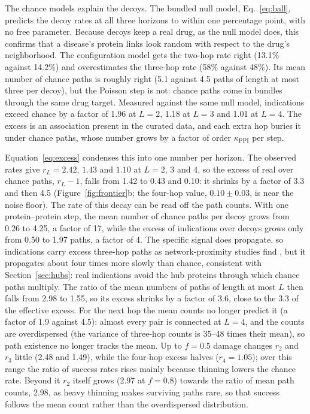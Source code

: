 The chance models explain the decoys. The bundled null model,
Eq.~\eqref{eq:ball}, predicts the decoy rates at all three horizons to within
one percentage point, with no free parameter. Because decoys keep a real drug,
as the null model does, this confirms that a disease's protein links look random
with respect to the drug's neighborhood. The configuration model gets the
two-hop rate right (13.1\% against 14.2\%) and overestimates the three-hop rate
(58\% against 48\%). Its mean number of chance paths is roughly right (5.1
against 4.5 paths of length at most three per decoy), but the Poisson step is
not: chance paths come in bundles through the same drug target. Measured
against the same null model, indications exceed chance by a factor of 1.96 at
$L=2$, 1.18 at $L=3$ and 1.01 at $L=4$. The excess is an association present
in the curated data, and each extra hop buries it under chance paths, whose number
grows by a factor of order $\kappa_{\mathrm{PPI}}$ per step.

Equation~\eqref{eq:excess} condenses this into one number per horizon. The
observed rates give $r_L=2.42$, $1.43$ and $1.10$ at $L=2$, 3 and 4, so the
excess of real over chance paths, $r_L-1$, falls from 1.42 to 0.43 and 0.10: it
shrinks by a factor of 3.3 and then 4.5 (Figure~\ref{fig:frontier}b;
the four-hop value, $0.10\pm0.03$, is near the noise floor). The rate of this
decay can be read off the path counts. With one protein--protein step, the mean
number of chance paths per decoy grows from 0.26 to 4.25, a factor of 17, while
the excess of indications over decoys grows only from 0.50 to 1.97 paths, a
factor of 4. The specific signal does propagate, so indications carry excess
three-hop paths as network-proximity studies find \cite{guney2016network}, but
it propagates about four times more slowly than chance, consistent with
Section~\ref{sec:hubs}: real indications avoid the hub proteins through which
chance paths multiply. The ratio of the mean numbers of paths of length at most
$L$ then falls from 2.98 to 1.55, so its excess shrinks by a factor of 3.6,
close to the 3.3 of the effective excess. For the next hop the mean counts no longer predict it (a
factor of 1.9 against 4.5): almost every pair is connected at $L=4$, and the
counts are overdispersed (the variance of three-hop counts is 35--48 times
their mean), so path existence no longer tracks the mean. Up to $f=0.5$
damage changes $r_2$ and $r_3$ little (2.48 and 1.49), while the four-hop excess
halves ($r_4=1.05$); over this range the ratio of success rates rises mainly
because thinning lowers the chance rate. Beyond it $r_2$ itself grows (2.97 at
$f=0.8$) towards the ratio of mean path counts, 2.98, as heavy thinning makes
surviving paths rare, so that success follows the mean count rather than the
overdispersed distribution.

